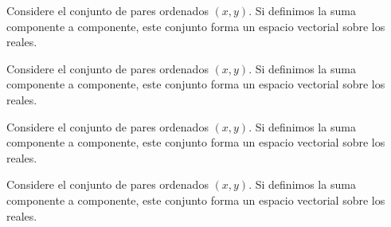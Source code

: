 \begin{ejemplo}[$\mathbb{R}^2$]
	Considere el conjunto de pares ordenados $(x, y)$. Si definimos la suma componente a componente, este conjunto forma un espacio vectorial sobre los reales.
\end{ejemplo}
\begin{ejemplo}[Matrices]
	Considere el conjunto de pares ordenados $(x, y)$. Si definimos la suma componente a componente, este conjunto forma un espacio vectorial sobre los reales.
\end{ejemplo}
\begin{ejemplo}[Funciones]
	Considere el conjunto de pares ordenados $(x, y)$. Si definimos la suma componente a componente, este conjunto forma un espacio vectorial sobre los reales.
\end{ejemplo}
\begin{ejemplo}
	Considere el conjunto de pares ordenados $(x, y)$. Si definimos la suma componente a componente, este conjunto forma un espacio vectorial sobre los reales.
\end{ejemplo}